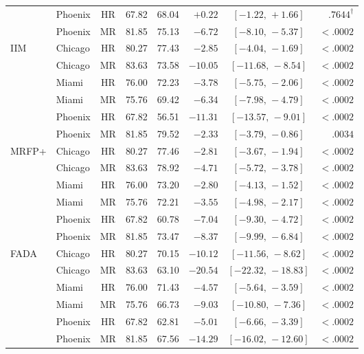 \begin{table}[h]
\begin{tabular}{@{}llcrrrcr@{}}
          & Phoenix & HR & 67.82 & 68.04 & $+0.22$  & $[-1.22,\,+1.66]$   & $.7644^{\dagger}$ \\
          & Phoenix & MR & 81.85 & 75.13 & $-6.72$  & $[-8.10,\,-5.37]$   & $<\!.0002$ \\
\cmidrule(l){1-8}
IIM       & Chicago & HR & 80.27 & 77.43 & $-2.85$  & $[-4.04,\,-1.69]$   & $<\!.0002$ \\
          & Chicago & MR & 83.63 & 73.58 & $-10.05$ & $[-11.68,\,-8.54]$  & $<\!.0002$ \\
          & Miami   & HR & 76.00 & 72.23 & $-3.78$  & $[-5.75,\,-2.06]$   & $<\!.0002$ \\
          & Miami   & MR & 75.76 & 69.42 & $-6.34$  & $[-7.98,\,-4.79]$   & $<\!.0002$ \\
          & Phoenix & HR & 67.82 & 56.51 & $-11.31$ & $[-13.57,\,-9.01]$  & $<\!.0002$ \\
          & Phoenix & MR & 81.85 & 79.52 & $-2.33$  & $[-3.79,\,-0.86]$   & $.0034$ \\
\cmidrule(l){1-8}
MRFP+     & Chicago & HR & 80.27 & 77.46 & $-2.81$  & $[-3.67,\,-1.94]$   & $<\!.0002$ \\
          & Chicago & MR & 83.63 & 78.92 & $-4.71$  & $[-5.72,\,-3.78]$   & $<\!.0002$ \\
          & Miami   & HR & 76.00 & 73.20 & $-2.80$  & $[-4.13,\,-1.52]$   & $<\!.0002$ \\
          & Miami   & MR & 75.76 & 72.21 & $-3.55$  & $[-4.98,\,-2.17]$   & $<\!.0002$ \\
          & Phoenix & HR & 67.82 & 60.78 & $-7.04$  & $[-9.30,\,-4.72]$   & $<\!.0002$ \\
          & Phoenix & MR & 81.85 & 73.47 & $-8.37$  & $[-9.99,\,-6.84]$   & $<\!.0002$ \\
\cmidrule(l){1-8}
FADA      & Chicago & HR & 80.27 & 70.15 & $-10.12$ & $[-11.56,\,-8.62]$  & $<\!.0002$ \\
          & Chicago & MR & 83.63 & 63.10 & $-20.54$ & $[-22.32,\,-18.83]$ & $<\!.0002$ \\
          & Miami   & HR & 76.00 & 71.43 & $-4.57$  & $[-5.64,\,-3.59]$   & $<\!.0002$ \\
          & Miami   & MR & 75.76 & 66.73 & $-9.03$  & $[-10.80,\,-7.36]$  & $<\!.0002$ \\
          & Phoenix & HR & 67.82 & 62.81 & $-5.01$  & $[-6.66,\,-3.39]$   & $<\!.0002$ \\
          & Phoenix & MR & 81.85 & 67.56 & $-14.29$ & $[-16.02,\,-12.60]$ & $<\!.0002$ \\

\end{tabular}
\end{table}
